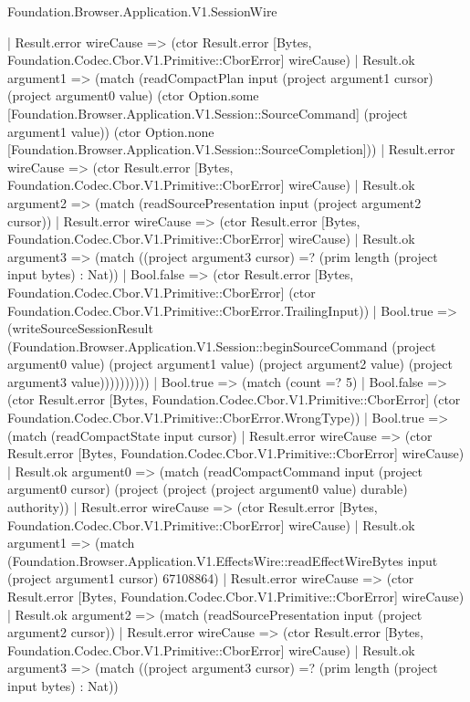\begin{lexlean}{Foundation.Browser.Application.V1.SessionWire}
\begin{semanticmodule}
{              | Result.error wireCause => (ctor Result.error [Bytes, Foundation.Codec.Cbor.V1.Primitive::CborError] wireCause)
              | Result.ok argument1 => (match (readCompactPlan input (project argument1 cursor) (project argument0 value) (ctor Option.some [Foundation.Browser.Application.V1.Session::SourceCommand] (project argument1 value)) (ctor Option.none [Foundation.Browser.Application.V1.Session::SourceCompletion]))
                | Result.error wireCause => (ctor Result.error [Bytes, Foundation.Codec.Cbor.V1.Primitive::CborError] wireCause)
                | Result.ok argument2 => (match (readSourcePresentation input (project argument2 cursor))
                  | Result.error wireCause => (ctor Result.error [Bytes, Foundation.Codec.Cbor.V1.Primitive::CborError] wireCause)
                  | Result.ok argument3 => (match ((project argument3 cursor) =? (prim length (project input bytes) : Nat))
                    | Bool.false => (ctor Result.error [Bytes, Foundation.Codec.Cbor.V1.Primitive::CborError] (ctor Foundation.Codec.Cbor.V1.Primitive::CborError.TrailingInput))
                    | Bool.true => (writeSourceSessionResult (Foundation.Browser.Application.V1.Session::beginSourceCommand (project argument0 value) (project argument1 value) (project argument2 value) (project argument3 value))))))))))
      | Bool.true => (match (count =? 5)
        | Bool.false => (ctor Result.error [Bytes, Foundation.Codec.Cbor.V1.Primitive::CborError] (ctor Foundation.Codec.Cbor.V1.Primitive::CborError.WrongType))
        | Bool.true => (match (readCompactState input cursor)
          | Result.error wireCause => (ctor Result.error [Bytes, Foundation.Codec.Cbor.V1.Primitive::CborError] wireCause)
          | Result.ok argument0 => (match (readCompactCommand input (project argument0 cursor) (project (project (project argument0 value) durable) authority))
            | Result.error wireCause => (ctor Result.error [Bytes, Foundation.Codec.Cbor.V1.Primitive::CborError] wireCause)
            | Result.ok argument1 => (match (Foundation.Browser.Application.V1.EffectsWire::readEffectWireBytes input (project argument1 cursor) 67108864)
              | Result.error wireCause => (ctor Result.error [Bytes, Foundation.Codec.Cbor.V1.Primitive::CborError] wireCause)
              | Result.ok argument2 => (match (readSourcePresentation input (project argument2 cursor))
                | Result.error wireCause => (ctor Result.error [Bytes, Foundation.Codec.Cbor.V1.Primitive::CborError] wireCause)
                | Result.ok argument3 => (match ((project argument3 cursor) =? (prim length (project input bytes) : Nat))
}
\end{semanticmodule}
\end{lexlean}
